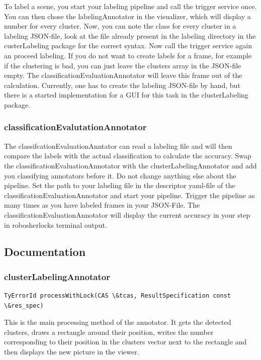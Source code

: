 \documentclass[main.tex]{subfiles}
\begin{document}
To label a scene, you start your labeling pipeline and call the trigger service once. You can then chose the labelingAnnotator in the visualizer, which will display a number for every cluster. Now, you can note the class for every cluster in a labeling JSON-file, look at the file already present in the labeling directory in the custerLabeling package for the correct syntax. Now call the trigger service again an proceed labeling. If you do not want to create labels for a frame, for example if the clustering is bad, you can just leave the clusters array in the JSON-file empty. The classificationEvaluationAnnotator will leave this frame out of the calculation. Currently, one has to create the labeling JSON-file by hand, but there is a started implementation for a GUI for this task in the clusterLabeling package.

\subsubsection{classificationEvalutationAnnotator}
The classifcationEvaluationAnntator can read a labeling file and will then compare the labels with the actual classification to calculate the accuracy. Swap the classificationEvaluationAnnotator with the clusterLabelingAnnotator and add you classifying annotators before it. Do not change anything else about the pipeline. Set the path to your labeling file in the descriptor yaml-file of the classificationEvaluationAnnotator and start your pipeline. Trigger the pipeline as many times as you have labeled frames in your JSON-File. The classificationEvaluationAnnotator will display the current accuracy in your step in robosherlocks terminal output. 

\subsection{Documentation}
\subsubsection{clusterLabelingAnnotator}
\begin{lstlisting}
TyErrorId processWithLock(CAS \&tcas, ResultSpecification const \&res_spec)
\end{lstlisting}
This is the main processing method of the annotator. It gets the detected clusters, draws a rectangle around their position, writes the number corresponding to their position in the clusters vector next to the rectangle and then displays the new picture in the viewer.
\end{document}
